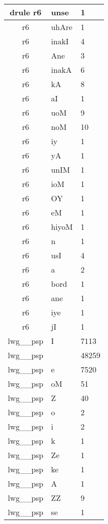 \documentclass[a4 paper]{article}
\begin{document}
\begin{longtable}{cp{}p{}}
drule r6 & unse & 1\\ \midrule r6 & uhAre & 1\\ \midrule r6 & inakI & 4\\ \midrule r6 & Ane & 3\\ \midrule r6 & inakA & 6\\ \midrule r6 & kA & 8\\ \midrule r6 & aI & 1\\ \midrule r6 & uoM & 9\\ \midrule r6 & noM & 10\\ \midrule r6 & iy & 1\\ \midrule r6 & yA & 1\\ \midrule r6 & unIM & 1\\ \midrule r6 & ioM & 1\\ \midrule r6 & OY & 1\\ \midrule r6 & eM & 1\\ \midrule r6 & hiyoM & 1\\ \midrule r6 & n & 1\\ \midrule r6 & usI & 4\\ \midrule r6 & a & 2\\ \midrule r6 & bord & 1\\ \midrule r6 & ane & 1\\ \midrule r6 & iye & 1\\ \midrule r6 & jI & 1\\ \midrule 
lwg\_\_psp & I & 7113\\ \midrule lwg\_\_psp &  & 48259\\ \midrule lwg\_\_psp & e & 7520\\ \midrule lwg\_\_psp & oM & 51\\ \midrule lwg\_\_psp & Z & 40\\ \midrule lwg\_\_psp & o & 2\\ \midrule lwg\_\_psp & i & 2\\ \midrule lwg\_\_psp & k & 1\\ \midrule lwg\_\_psp & Ze & 1\\ \midrule lwg\_\_psp & ke & 1\\ \midrule lwg\_\_psp & A & 1\\ \midrule lwg\_\_psp & ZZ & 9\\ \midrule lwg\_\_psp & se & 1\\ \midrule 

\end{longtable}
\end{document}
